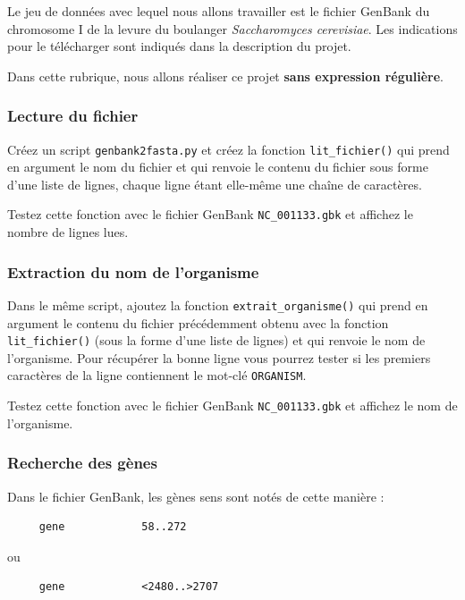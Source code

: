 \documentclass[a4paper,11pt,twoside]{book}
\begin{document}
Le jeu de données avec lequel nous allons travailler est le fichier
GenBank du chromosome I de la levure du boulanger \emph{Saccharomyces
cerevisiae}. Les indications pour le télécharger sont indiqués dans la
description du projet.

Dans cette rubrique, nous allons réaliser ce projet \textbf{sans
expression régulière}.

\subsubsection{Lecture du fichier}\label{lecture-du-fichier}

Créez un script \texttt{genbank2fasta.py} et créez la fonction
\texttt{lit\_fichier()} qui prend en argument le nom du fichier et qui
renvoie le contenu du fichier sous forme d'une liste de lignes, chaque
ligne étant elle-même une chaîne de caractères.

Testez cette fonction avec le fichier GenBank \texttt{NC\_001133.gbk} et
affichez le nombre de lignes lues.

\subsubsection{Extraction du nom de
l'organisme}\label{extraction-du-nom-de-lorganisme}

Dans le même script, ajoutez la fonction \texttt{extrait\_organisme()}
qui prend en argument le contenu du fichier précédemment obtenu avec la
fonction \texttt{lit\_fichier()} (sous la forme d'une liste de lignes)
et qui renvoie le nom de l'organisme. Pour récupérer la bonne ligne vous
pourrez tester si les premiers caractères de la ligne contiennent le
mot-clé \texttt{ORGANISM}.

Testez cette fonction avec le fichier GenBank \texttt{NC\_001133.gbk} et
affichez le nom de l'organisme.

\subsubsection{Recherche des gènes}\label{recherche-des-guxe8nes}

Dans le fichier GenBank, les gènes sens sont notés de cette manière :

\begin{verbatim}
     gene            58..272
\end{verbatim}

ou

\begin{verbatim}
     gene            <2480..>2707
\end{verbatim}
\end{document}
